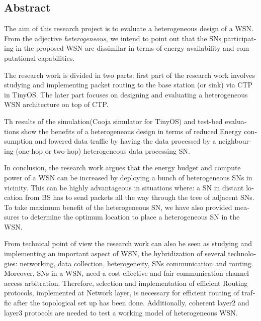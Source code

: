 \begingroup
\let\clearpage\relax
\let\cleardoublepage\relax
\let\cleardoublepage\relax

\begin{otherlanguage}{american}
\chapter*{Abstract}
The aim of this research project is to evaluate a heterogeneous design of a \ac{WSN}. From the adjective \textit{heterogeneous}, we intend to point out that the \acp{SN} participating in the proposed \ac{WSN} are dissimilar in terms of energy availability and computational capabilities.   

\par
The research work is divided in two parts: first part of the research work involves studying and implementing packet routing to the base station (or sink) via \ac{CTP} in TinyOS. The later part focuses on designing and evaluating a heterogeneous \ac{WSN} architecture on top of \ac{CTP}.

\par

Th results of the simulation(Cooja simulator for TinyOS) and test-bed evaluations show the benefits of a heterogeneous design in terms of reduced Energy consumption and lowered data traffic by having the data processed by a neighbouring (one-hop or two-hop) heterogeneous data processing \ac{SN}. 

\par
In conclusion, the research work argues that the energy budget and compute power of a \ac{WSN} can be increased by deploying a bunch of heterogeneous \acp{SN} in vicinity. This can be highly advantageous in situations where: a \ac{SN} in distant location from \ac{BS} has to send packets all the way through the tree of adjacent \acp{SN}. To take maximum benefit of the heterogeneous \ac{SN}, we have also provided measures to determine the optimum location to place a heterogeneous \ac{SN} in the \ac{WSN}.


\par
From technical point of view the research work can also be seen as studying and implementing an important aspect of \ac{WSN}, the hybridization of several technologies: networking, data collection, heterogeneity,  \acp{SN} communication and routing. Moreover, \acp{SN} in a \ac{WSN}, need a cost-effective and fair communication channel access arbitration. Therefore, selection and implementation of efficient Routing protocols, implemented at Network layer, is necessary for efficient routing of traffic after the topological set up has been done. Additionally, coherent layer2 and layer3 protocols are needed to test a working model of heterogeneous \ac{WSN}.
\end{otherlanguage}


\endgroup			

\vfill
